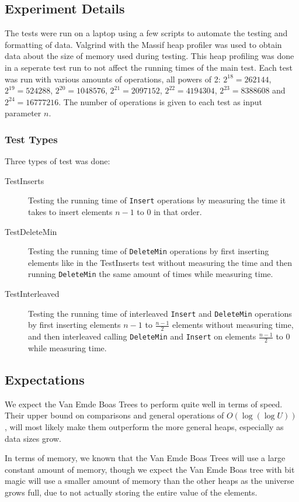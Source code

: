 \subsection{Experiment Details}
The tests were run on a laptop using a few scripts to automate the testing and formatting of data. Valgrind with the Massif heap profiler was used to obtain data about the size of memory used during testing. This heap profiling was done in a seperate test run to not affect the running times of the main test.
Each test was run with various amounts of operations, all powers of 2: $2^{18}=262144$, $2^{19}=524288$, $2^{20}=1048576$, $2^{21}=2097152$, $2^{22}=4194304$, $2^{23}=8388608$ and $2^{24}=16777216$. The number of operations is given to each test as input parameter $n$.

\subsubsection{Test Types}
Three types of test was done:
\begin{description}
\item[TestInserts] Testing the running time of \texttt{Insert} operations by measuring the time it takes to insert elements $n-1$ to $0$ in that order.
\item[TestDeleteMin] Testing the running time of \texttt{DeleteMin} operations by first inserting elements like in the TestInserts test without measuring the time and then running \texttt{DeleteMin} the same amount of times while measuring time.
\item[TestInterleaved] Testing the running time of interleaved \texttt{Insert} and \texttt{DeleteMin} operations by first inserting elements $n-1$ to $\frac{n-1}{2}$ elements without measuring time, and then interleaved calling \texttt{DeleteMin} and \texttt{Insert} on elements $\frac{n-1}{2}$ to $0$ while measuring time.
\end{description}



\subsection{Expectations}

We expect the Van Emde Boas Trees to perform quite well in terms of speed. Their upper bound on comparisons and general operations of $O(\log (\log U))$, will most likely  make them outperform the more general heaps, especially as data sizes grow.

In terms of memory, we known that the Van Emde Boas Trees will use a large constant amount of memory, though we expect the Van Emde Boas tree with bit magic will use a smaller amount of memory than the other heaps as the universe grows full, due to not actually storing the entire value of the elements.

